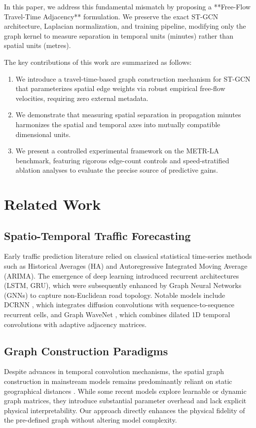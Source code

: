 \documentclass[pdflatex,sn-mathphys-num]{sn-jnl}
\theoremstyle{thmstyleone}
\theoremstyle{thmstyletwo}
\theoremstyle{thmstylethree}
\begin{document}
In this paper, we address this fundamental mismatch by proposing a **Free-Flow Travel-Time Adjacency** formulation. We preserve the exact ST-GCN architecture, Laplacian normalization, and training pipeline, modifying only the graph kernel to measure separation in temporal units (minutes) rather than spatial units (metres).

The key contributions of this work are summarized as follows:
\begin{enumerate}
    \item We introduce a travel-time-based graph construction mechanism for ST-GCN that parameterizes spatial edge weights via robust empirical free-flow velocities, requiring zero external metadata.
    \item We demonstrate that measuring spatial separation in propagation minutes harmonizes the spatial and temporal axes into mutually compatible dimensional units.
    \item We present a controlled experimental framework on the METR-LA benchmark, featuring rigorous edge-count controls and speed-stratified ablation analyses to evaluate the precise source of predictive gains.
\end{enumerate}

\section{Related Work}\label{sec:related}

\subsection{Spatio-Temporal Traffic Forecasting}
Early traffic prediction literature relied on classical statistical time-series methods such as Historical Averages (HA) and Autoregressive Integrated Moving Average (ARIMA). The emergence of deep learning introduced recurrent architectures (LSTM, GRU), which were subsequently enhanced by Graph Neural Networks (GNNs) to capture non-Euclidean road topology. Notable models include DCRNN \cite{li2018diffusion}, which integrates diffusion convolutions with sequence-to-sequence recurrent cells, and Graph WaveNet \cite{wu2019graph}, which combines dilated 1D temporal convolutions with adaptive adjacency matrices.

\subsection{Graph Construction Paradigms}
Despite advances in temporal convolution mechanisms, the spatial graph construction in mainstream models remains predominantly reliant on static geographical distances \cite{yu2018spatio}. While some recent models explore learnable or dynamic graph matrices, they introduce substantial parameter overhead and lack explicit physical interpretability. Our approach directly enhances the physical fidelity of the pre-defined graph without altering model complexity.
\end{document}
